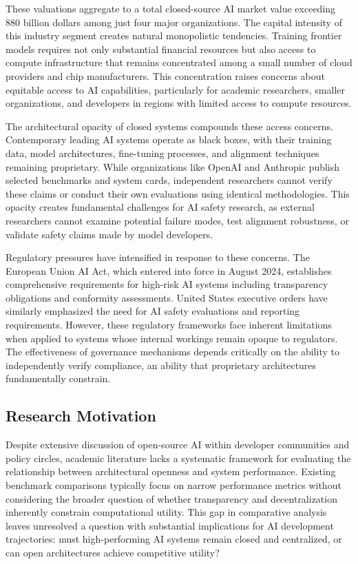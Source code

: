 These valuations aggregate to a total closed-source AI market value exceeding 880 billion dollars among just four major organizations. The capital intensity of this industry segment creates natural monopolistic tendencies. Training frontier models requires not only substantial financial resources but also access to compute infrastructure that remains concentrated among a small number of cloud providers and chip manufacturers. This concentration raises concerns about equitable access to AI capabilities, particularly for academic researchers, smaller organizations, and developers in regions with limited access to compute resources.

The architectural opacity of closed systems compounds these access concerns. Contemporary leading AI systems operate as black boxes, with their training data, model architectures, fine-tuning processes, and alignment techniques remaining proprietary. While organizations like OpenAI and Anthropic publish selected benchmarks and system cards, independent researchers cannot verify these claims or conduct their own evaluations using identical methodologies. This opacity creates fundamental challenges for AI safety research, as external researchers cannot examine potential failure modes, test alignment robustness, or validate safety claims made by model developers.

Regulatory pressures have intensified in response to these concerns. The European Union AI Act, which entered into force in August 2024, establishes comprehensive requirements for high-risk AI systems including transparency obligations and conformity assessments. United States executive orders have similarly emphasized the need for AI safety evaluations and reporting requirements. However, these regulatory frameworks face inherent limitations when applied to systems whose internal workings remain opaque to regulators. The effectiveness of governance mechanisms depends critically on the ability to independently verify compliance, an ability that proprietary architectures fundamentally constrain.

\subsection{Research Motivation}

Despite extensive discussion of open-source AI within developer communities and policy circles, academic literature lacks a systematic framework for evaluating the relationship between architectural openness and system performance. Existing benchmark comparisons typically focus on narrow performance metrics without considering the broader question of whether transparency and decentralization inherently constrain computational utility. This gap in comparative analysis leaves unresolved a question with substantial implications for AI development trajectories: must high-performing AI systems remain closed and centralized, or can open architectures achieve competitive utility?

